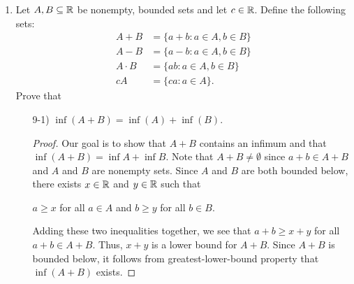 \documentclass[11pt,a4paper]{article}
\begin{document}
\begin{enumerate}
\begin{proof}
     To show that \( E  \) contains a minimum, we suppose for contradiction that \( \inf E \notin E  \). Now, pick \( \epsilon = \frac{ 1 }{ 5 }   \). By {\hyperref[Problem 2]{Part 2 of Problem 7}}, the open interval \( (\inf E, \inf E + \frac{ 1 }{ 5 } ) \) intersects \( E  \) at infinitely many points (these points being natural numbers). Suppose we choose an \( m \in \N \) such that \( m  \in (\inf E , \inf E + \frac{ 1 }{ 5 }  ) \).  Note that \( m  \) also lies interval \( (m - 1, m + 1) \). Thus, \( (\inf E, \inf E + \epsilon) \subseteq (m-1,m+1) \). However, we see that \( (\inf E, \inf E + \frac{ 1 }{ 5 }) \) contains infinitely many natural numbers which cannot happen within the open interval \( (m-1,m+1) \) since this interval contains at most only one element, namely \( m \), which is a contradiction. Hence, it must be the case that \( \inf E \in E  \); that is, \( E  \) contains a minimum.
\end{proof}

\item Let \( A, B \subseteq \mathbb{R}  \) be nonempty, bounded sets and let \( c \in \mathbb{R}  \). Define the following sets:
    \begin{align*}
        A + B &= \{ a + b : a \in A, b \in B \}  \\
        A - B &= \{ a - b : a \in A , b \in B  \}  \\
        A \cdot B &= \{ ab : a \in A, b \in B \} \\
        cA &= \{ ca: a \in A \}.
    \end{align*}
    Prove that 
    \begin{enumerate}
        \item[9-1)] \( \inf(A + B) = \inf(A) + \inf(B) \).
            \begin{proof}
             Our goal is to show that \( A + B  \) contains an infimum and that 
                 \( \inf(A+B) = \inf A + \inf B  \). Note that \( A + B \neq \emptyset \) since \(  a + b \in A + B  \) and \( A  \) and \( B  \) are nonempty sets. Since \( A  \) and \( B  \) are both bounded below, there exists \( x \in \mathbb{R}  \) and \( y \in \mathbb{R}  \) such that 
                 \begin{center}
                     \( a \geq x  \) for all \( a \in A  \) and \( b \geq y  \) for all \( b \in B  \).
                 \end{center}
                 Adding these two inequalities together, we see that \(  a + b \geq x + y  \) for all \( a + b \in A + B  \). Thus, \( x + y  \) is a lower bound for \( A + B  \). Since \( A + B  \) is bounded below, it follows from greatest-lower-bound property that \( \inf(A+B)  \) exists.   


\end{proof}
\end{enumerate}
\end{enumerate}
\end{document}
